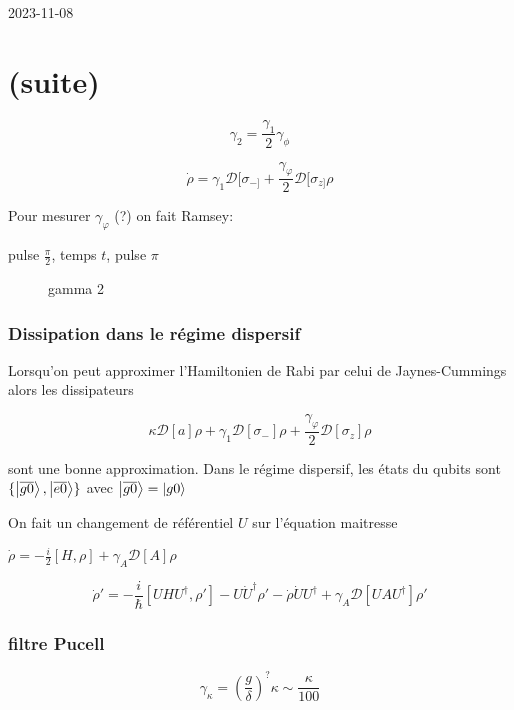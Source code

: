 


2023-11-08

\section*{(suite)}

\[ \gamma_2 = \frac{\gamma_1}{2} \gamma_{\phi}  \]

\[ \dot \rho = \gamma_1 \mathcal{D}[\sigma_{-]} + \frac{\gamma_{\varphi}}{2} \mathcal{D}[\sigma_{z]} \rho  \]

Pour mesurer $\gamma_\varphi$ (?) on fait Ramsey:

pulse $\frac{\pi}{2} $, temps $t$, pulse $\pi$ 

\begin{figure}[ht]
    \centering
    \caption{gamma 2}
    \label{fig:gamma-2}
\end{figure}


\setcounter{section}{5}
\setcounter{subsection}{4}
\setcounter{subsubsection}{2}

\subsubsection{Dissipation dans le régime dispersif}

Lorsqu'on peut approximer l'Hamiltonien de Rabi par celui de Jaynes-Cummings alors les dissipateurs 

\[ \kappa \mathcal{D}[a]\rho + \gamma_1 \mathcal{D}[\sigma_-]\rho  + \frac{\gamma_{\varphi}}{2} \mathcal{D}[\sigma_z]\rho \]

sont une bonne approximation. Dans le régime dispersif, les états du qubits sont $\{ \ket{\overline{g0}}, \ket{\overline{e0}}\} $ avec $\ket{\overline{g0}} = \ket{g0}$

On fait un changement de référentiel $U$ sur l'équation maitresse 

$\dot \rho = -\frac{i}{2} [H, \rho] + \gamma_A \mathcal{D}[A]\rho $

\[ \dot \rho' = - \frac{i}{\hbar} [UHU^{\dagger}, \rho'] - U\dot U^{\dagger}\rho' - \dot \rho \dot U U^{\dagger} + \gamma_A \mathcal{D}[UAU^{\dagger}] \rho ' \]

\subsubsection{filtre Pucell}

\[ \gamma_{\kappa} =  \left( \frac{g}{\delta}  \right)^? \kappa \sim \frac{\kappa}{100}   \]

